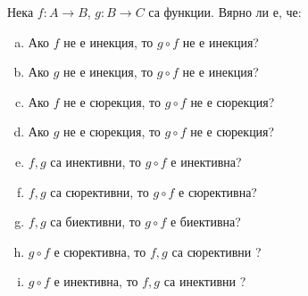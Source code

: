 \begin{problem}
  Нека $f: A\to B$, $g: B\to C$ са функции.
  Вярно ли е, че:
  \begin{enumerate}[a)]
  \item 
    Ако $f$ не е инекция, то $g\circ f$ не е инекция?
  \item
    Ако $g$ не е инекция, то $g\circ f$ не е инекция?
  \item 
    Ако $f$ не е сюрекция, то $g\circ f$ не е сюрекция?
  \item
    Ако $g$ не е сюрекция, то $g\circ f$ не е сюрекция?
  \item
    $f,g$ са инективни, то $g\circ f$ е инективна?
  \item
    $f,g$ са сюрективни, то $g\circ f$ е сюрективна?
  \item
    $f,g$ са биективни, то $g\circ f$ е биективна?
  \item
    $g\circ f$ е сюрективна,  то $f,g$ са сюрективни ?
  \item
    $g\circ f$ е инективна, то $f,g$ са инективни ?
  \end{enumerate}
\end{problem}


